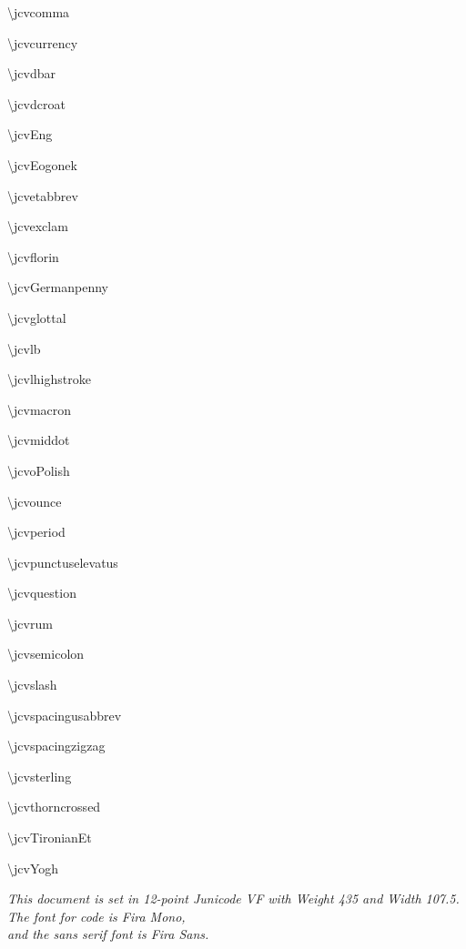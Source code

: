 \documentclass[12pt]{article}
\begin{document}
\begin{multicols}{3}
\textbackslash jcvcomma

\textbackslash jcvcurrency

\textbackslash jcvdbar

\textbackslash jcvdcroat

\textbackslash jcvEng

\textbackslash jcvEogonek

\textbackslash jcvetabbrev

\textbackslash jcvexclam

\textbackslash jcvflorin

\textbackslash jcvGermanpenny

\textbackslash jcvglottal

\textbackslash jcvlb

\textbackslash jcvlhighstroke %

\textbackslash jcvmacron

\textbackslash jcvmiddot

\textbackslash jcvoPolish

\textbackslash jcvounce

\textbackslash jcvperiod

\textbackslash jcvpunctuselevatus

\textbackslash jcvquestion

\textbackslash jcvrum

\textbackslash jcvsemicolon

\textbackslash jcvslash

\textbackslash jcvspacingusabbrev

\textbackslash jcvspacingzigzag

\textbackslash jcvsterling

\textbackslash jcvthorncrossed

\textbackslash jcvTironianEt

\textbackslash jcvYogh
\end{multicols}

\vspace*{\fill}
\begin{center}
    \itshape This document is set in 12-point Junicode VF with Weight 435 and Width 107.5.\\
    The font for code is Fira Mono,\\
    and the sans serif font is Fira Sans.
\end{center}
\end{document}
